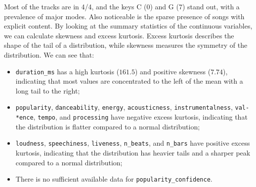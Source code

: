 Most of the tracks are in 4/4, and the keys C (0) and G (7) stand out, with a prevalence of major modes. Also noticeable is the sparse presence of songs with explicit content. By looking at the summary statistics of the continuous variables, we can calculate skewness and excess kurtosis. Excess kurtosis describes the shape of the tail of a distribution, while skewness measures the symmetry of the distribution. We can see that:
\begin{itemize}
\item \texttt{duration\_ms} has a high kurtosis ($161.5$) and positive skewness ($7.74$), indicating that most values are concentrated to the left of the mean with a long tail to the right;
\item \texttt{popularity}, \texttt{danceability}, \texttt{energy}, \texttt{acousticness}, \texttt{instrumentalness}, \texttt{val-\\*ence}, \texttt{tempo}, and \texttt{processing} have negative excess kurtosis, indicating that the distribution is flatter compared to a normal distribution;
\item \texttt{loudness}, \texttt{speechiness}, \texttt{liveness}, \texttt{n\_beats}, and \texttt{n\_bars} have positive excess kurtosis, indicating that the distribution has heavier tails and a sharper peak compared to a normal distribution;
\item There is no sufficient available data for \texttt{popularity\_confidence}.
\end{itemize}
\begin{comment}
\begin{figure}[!htb]
   \begin{minipage}{0.48\textwidth}
     \centering
     \texttt{[image: img/durationms\_hist.png]}
     \caption{Distribution of the feature 'duration\_ms'}\label{Fig:durationms_hist}
   \end{minipage}\hfill
   \begin{minipage}{0.48\textwidth}
     \centering
     \texttt{[image: img/popularity\_hist.png]}
     \caption{Distribution of the feature 'popularity'}\label{Fig:popularity_hist}
   \end{minipage}
\end{figure}
\end{comment}

